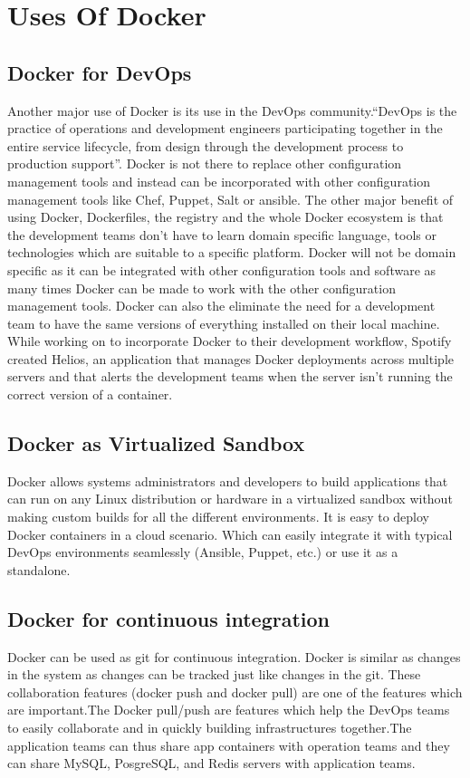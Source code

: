 \documentclass[9pt,twocolumn,twoside]{../../styles/osajnl}
\begin{document}
\section{Uses Of Docker}

\subsection{Docker for DevOps}
Another major use of Docker is its use in the DevOps
community.``DevOps is the practice of operations and development
engineers participating together in the entire service lifecycle, from
design through the development process to production
support\cite{www-devops}''. Docker is not there to replace other
configuration management tools and instead can be incorporated with
other configuration management tools like Chef, Puppet, Salt or
ansible. The other major benefit of using Docker, Dockerfiles, the
registry and the whole Docker ecosystem is that the development teams
don't have to learn domain specific language, tools or technologies
which are suitable to a specific platform. Docker will
not be domain specific as it can be integrated with other
configuration tools and software as many times Docker can be
made to work with the other configuration management tools. Docker can
also the eliminate the need for a development team to have the same
versions of everything installed on their local
machine\cite{www-docker-1}. While working on to incorporate Docker to
their development workflow, Spotify created Helios, an application that
manages Docker deployments across multiple servers and that alerts the
development teams when the server isn't running the correct version of
a container.

\subsection{Docker as Virtualized Sandbox}
Docker allows systems administrators and developers to build
applications that can run on any Linux distribution or hardware in a
virtualized sandbox without making custom builds for all the different
environments\cite{www-docker-1}. It is easy to deploy Docker
containers in a cloud scenario. Which can easily integrate it with
typical DevOps environments seamlessly (Ansible, Puppet, etc.) or use
it as a standalone.

\subsection{Docker for continuous integration}
Docker can be used as git for continuous integration. Docker is
similar as changes in the system as changes can be tracked just like
changes in the git.  These collaboration features (docker push and
docker pull) are one of the features which are important.The Docker
pull/push are features which help the DevOps teams to easily
collaborate and in quickly building infrastructures together.The
application teams can thus share app containers with operation teams
and they can share MySQL, PosgreSQL, and Redis servers with
application teams\cite{www-docker-2}.
\end{document}
